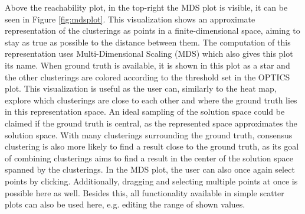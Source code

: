 \documentclass[
	a4paper,
	english,
	twoside,
	openright,               
	11pt                            
	]{report}
\begin{document}
Above the reachability plot, in the top-right the MDS plot is visible, it can be seen in Figure \ref{fig:mdsplot}. This visualization shows an approximate representation of the clusterings as points in a finite-dimensional space, aiming to stay as true as possible to the distance between them. The computation of this representation uses Multi-Dimensional Scaling (MDS) \cite{mds} which also gives this plot its name. When ground truth is available, it is shown in this plot as a star and the other clusterings are colored according to the threshold set in the OPTICS plot. This visualization is useful as the user can, similarly to the heat map, explore which clusterings are close to each other and where the ground truth lies in this representation space. An ideal sampling of the solution space could be claimed if the ground truth is central, as the represented space approximates the solution space. With many clusterings surrounding the ground truth, consensus clustering is also more likely to find a result close to the ground truth, as its goal of combining clusterings aims to find a result in the center of the solution space spanned by the clusterings. In the MDS plot, the user can also once again select points by clicking. Additionally, dragging and selecting multiple points at once is possible here as well. Besides this, all functionality available in simple scatter plots can also be used here, e.g. editing the range of shown values.
\end{document}
